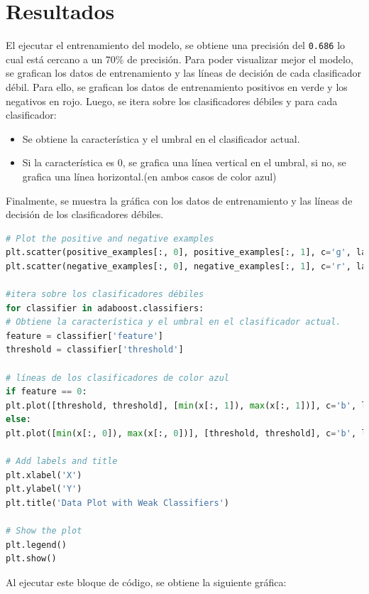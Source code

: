 \documentclass{article}
\begin{document}
    \section{Resultados}\label{sec:resultados}
    \newline
    El ejecutar el entrenamiento del modelo, se obtiene una precisión del \texttt{0.686} lo cual está cercano a un 70\% de precisión.
    Para poder visualizar mejor el modelo, se grafican los datos de entrenamiento y las líneas de decisión de cada clasificador débil.
    Para ello, se grafican los datos de entrenamiento positivos en verde y los negativos en rojo.
    Luego, se itera sobre los clasificadores débiles y para cada clasificador:
    \begin{itemize}
        \item Se obtiene la característica y el umbral en el clasificador actual.
        \item Si la característica es 0, se grafica una línea vertical en el umbral, si no, se grafica una línea horizontal.(en ambos casos de color azul)
    \end{itemize}
Finalmente, se muestra la gráfica con los datos de entrenamiento y las líneas de decisión de los clasificadores débiles.
    \begin{lstlisting}[language=Python, caption={Plotting the decision boundaries}, label={lst:plotting}]
# Plot the positive and negative examples
plt.scatter(positive_examples[:, 0], positive_examples[:, 1], c='g', label='Positive examples')
plt.scatter(negative_examples[:, 0], negative_examples[:, 1], c='r', label='Negative examples')

#itera sobre los clasificadores débiles
for classifier in adaboost.classifiers:
# Obtiene la característica y el umbral en el clasificador actual.
feature = classifier['feature']
threshold = classifier['threshold']

# líneas de los clasificadores de color azul
if feature == 0:
plt.plot([threshold, threshold], [min(x[:, 1]), max(x[:, 1])], c='b', linestyle='--')
else:
plt.plot([min(x[:, 0]), max(x[:, 0])], [threshold, threshold], c='b', linestyle='--')

# Add labels and title
plt.xlabel('X')
plt.ylabel('Y')
plt.title('Data Plot with Weak Classifiers')

# Show the plot
plt.legend()
plt.show()
    \end{lstlisting}
    \clearpage
    Al ejecutar este bloque de código, se obtiene la siguiente gráfica:
\end{document}
